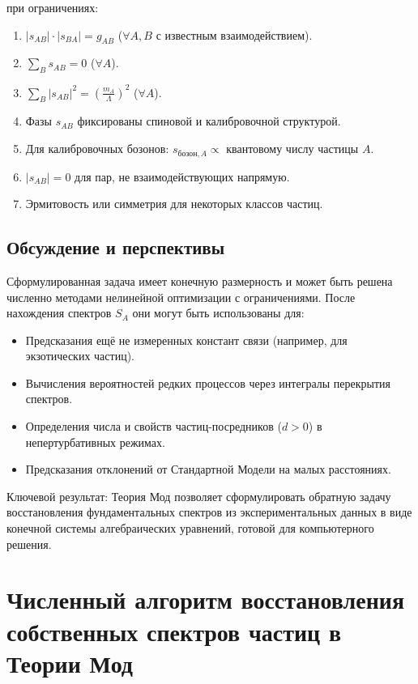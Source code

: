 \documentclass[12pt,a4paper]{article}
\begin{document}
при ограничениях:
\begin{enumerate}[label=(\arabic*)]
    \item $|s_{AB}| \cdot |s_{BA}| = g_{AB}$ \quad ($\forall A, B$ с известным взаимодействием).
    \item $\sum_{B} s_{AB} = 0$ \quad ($\forall A$).
    \item $\sum_{B} |s_{AB}|^2 = \left( \frac{m_A}{\Lambda} \right)^2$ \quad ($\forall A$).
    \item Фазы $s_{AB}$ фиксированы спиновой и калибровочной структурой.
    \item Для калибровочных бозонов: $s_{\text{бозон}, A} \propto$ квантовому числу частицы $A$.
    \item $|s_{AB}| = 0$ для пар, не взаимодействующих напрямую.
    \item Эрмитовость или симметрия для некоторых классов частиц.
\end{enumerate}

\subsection{Обсуждение и перспективы}
Сформулированная задача имеет конечную размерность и может быть решена численно методами нелинейной оптимизации с ограничениями. После нахождения спектров $S_A$ они могут быть использованы для:

\begin{itemize}
    \item Предсказания ещё не измеренных констант связи (например, для экзотических частиц).
    \item Вычисления вероятностей редких процессов через интегралы перекрытия спектров.
    \item Определения числа и свойств частиц-посредников ($d > 0$) в непертурбативных режимах.
    \item Предсказания отклонений от Стандартной Модели на малых расстояниях.
\end{itemize}

Ключевой результат: Теория Мод позволяет сформулировать обратную задачу восстановления фундаментальных спектров из экспериментальных данных в виде конечной системы алгебраических уравнений, готовой для компьютерного решения.

\newpage
\section{Численный алгоритм восстановления собственных спектров частиц в Теории Мод}
\end{document}
